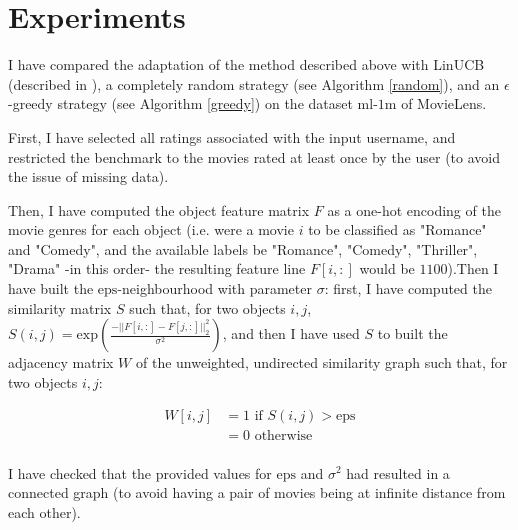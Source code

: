 \documentclass{article}
\begin{document}
\section{Experiments}

I have compared the adaptation of the method described above with LinUCB (described in \cite{chu2011contextual}), a completely random strategy (see Algorithm \ref{random}), and an $\epsilon$-greedy strategy (see Algorithm \ref{greedy}) on the dataset $\text{ml-1m}$ of MovieLens. 

First, I have selected all ratings associated with the input username, and restricted the benchmark to the movies rated at least once by the user (to avoid the issue of missing data).

Then, I have computed the object feature matrix $F$ as a one-hot encoding of the movie genres for each object (i.e. were a movie $i$ to be classified as "Romance" and "Comedy", and the available labels be "Romance", "Comedy", "Thriller", "Drama" -in this order- the resulting feature line $F[i, :]$ would be $1100$).Then I have built the $\text{eps}$-neighbourhood with parameter $\sigma$: first, I have computed the similarity matrix $S$ such that, for two objects $i,j$, $S(i,j) = \text{exp}(\frac{-||F[i,:]-F[j,:]||^{2}_{2}}{\sigma^{2}})$, and then I have used $S$ to built the adjacency matrix $W$ of the unweighted, undirected similarity graph such that, for two objects $i, j$:

\begin{equation}
\begin{split}
W[i, j] & = 1 \mbox{ if $S(i,j) > \text{eps}$}\\
& = 0 \mbox{ otherwise}\\ 
\end{split}
\end{equation}

I have checked that the provided values for $\text{eps}$ and $\sigma^{2}$ had resulted in a connected graph (to avoid having a pair of movies being at infinite distance from each other).
\end{document}
